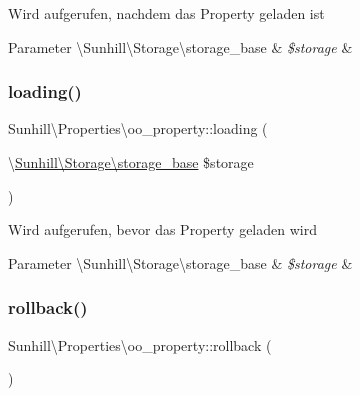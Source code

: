 Wird aufgerufen, nachdem das Property geladen ist 
\begin{DoxyParams}[1]{Parameter}
\textbackslash{}\+Sunhill\textbackslash{}\+Storage\textbackslash{}storage\+\_\+base & {\em \$storage} & \\
\hline
\end{DoxyParams}
\mbox{\label{classSunhill_1_1Properties_1_1oo__property_adeb90c421aeca9cf753192fcabc1cc04}} 
\subsubsection{\texorpdfstring{loading()}{loading()}}
{\footnotesize\ttfamily Sunhill\textbackslash{}\+Properties\textbackslash{}oo\+\_\+property\+::loading (\begin{DoxyParamCaption}\item[{\textbackslash{}\hyperlink{classSunhill_1_1Storage_1_1storage__base}{Sunhill\textbackslash{}\+Storage\textbackslash{}storage\+\_\+base}}]{\$storage }\end{DoxyParamCaption})}

Wird aufgerufen, bevor das Property geladen wird 
\begin{DoxyParams}[1]{Parameter}
\textbackslash{}\+Sunhill\textbackslash{}\+Storage\textbackslash{}storage\+\_\+base & {\em \$storage} & \\
\hline
\end{DoxyParams}
\mbox{\label{classSunhill_1_1Properties_1_1oo__property_a8e2e47b4d249c580ac27663a7df4c24c}} 
\subsubsection{\texorpdfstring{rollback()}{rollback()}}
{\footnotesize\ttfamily Sunhill\textbackslash{}\+Properties\textbackslash{}oo\+\_\+property\+::rollback (\begin{DoxyParamCaption}{ }\end{DoxyParamCaption})}

